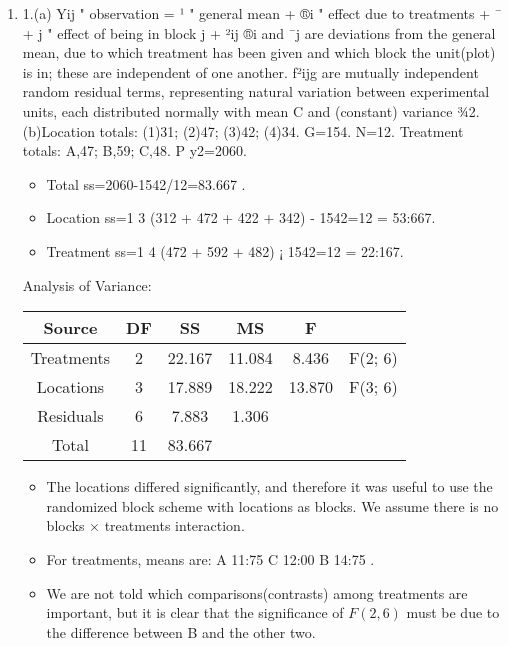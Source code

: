 \documentclass[a4paper,12pt]{article}
\begin{document}
\begin{enumerate}
\item 1.(a) Yij
"
observation
= ¹
"
general mean
+ ®i
"
effect
due to
treatments
+ ¯ + j
"
effect of
being in
block j
+ ²ij
®i and ¯j are deviations from the general mean, due to which treatment has been given and
which block the unit(plot) is in; these are independent of one another.
f²ijg are mutually independent random residual terms, representing natural variation between
experimental units, each distributed normally with mean C and (constant) variance ¾2.
(b)Location totals: (1)31; (2)47; (3)42; (4)34. G=154. N=12.
Treatment totals: A,47; B,59; C,48.
P
y2=2060.
\begin{itemize}
    \item Total ss=2060-1542/12=83.667 .
\item Location ss=1
3 (312 + 472 + 422 + 342) - 1542=12 = 53:667.
\item Treatment ss=1
4 (472 + 592 + 482) ¡ 1542=12 = 22:167.
\end{itemize}


Analysis of Variance:
\begin{center}
\begin{tabular}{|c|c|c|c|c|c|}\hline
Source	&	DF	&	SS	&	MS	&	F &	 \\ \hline \hline
Treatments	&	2	&	22.167	&	11.084	&	8.436	& F(2; 6)\\ \hline
Locations	&	3	&	17.889	&	18.222	&	13.870	& F(3; 6) \\ \hline
Residuals	&	6	&	7.883	&	1.306	&		& \\ \hline
Total	&	11	&	83.667	&		&		& \\ \hline
\end{tabular}
\end{center}

\begin{itemize}
    \item The locations differed significantly, and therefore it was useful to use the randomized block scheme
with locations as blocks. We assume there is no blocks $\times$ treatments interaction.
\item  For treatments, means are: A 11:75
C 12:00
B 14:75
. 
\item We are not told which comparisons(contrasts) among
treatments are important, but it is clear that the significance of $F(2,6)$ must be due to the difference
between B and the other two.
\end{itemize}


\end{enumerate}
\end{document}
